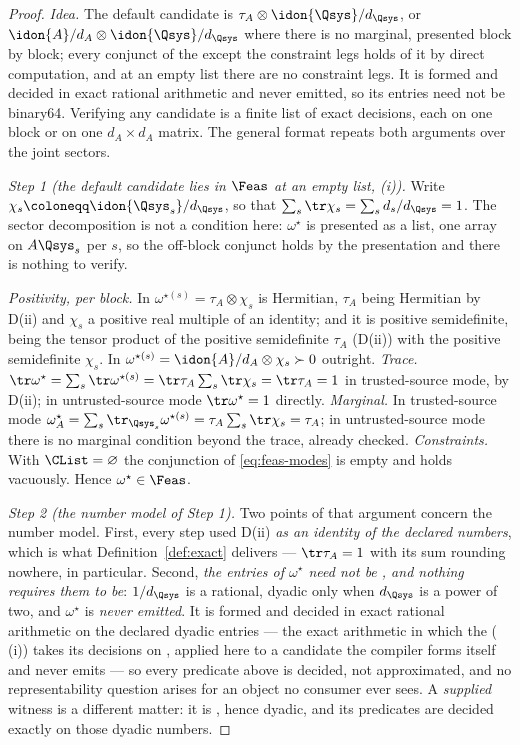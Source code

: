 \begin{proof}
\emph{Idea.} The default candidate is $\tau_A\otimes\idon{\Qsys}/d_{\Qsys}$,
or $\idon{A}/d_A\otimes\idon{\Qsys}/d_{\Qsys}$ where there is no marginal,
presented block by block; every conjunct of the  except
the constraint legs holds of it by direct computation, and at an empty list
there are no constraint legs. It is formed and decided in
exact rational arithmetic and never emitted, so its entries need not be
binary64. Verifying any candidate is a finite list of exact decisions, each on
one block or on one $d_A\times d_A$ matrix. The general format repeats both
arguments over the joint sectors.

\emph{Step 1 (the default candidate lies in $\Feas$ at an empty list, (i)).}
Write $\chi_s\coloneqq\idon{\Qsys_s}/d_{\Qsys}$, so that
$\sum_s\tr\chi_s=\sum_sd_s/d_{\Qsys}=1$. The sector decomposition is not a
condition here: $\omega^{\star}$ is presented as a list, one array on
$A\Qsys_s$ per $s$, so the off-block conjunct holds by the presentation and
there is nothing to verify.

\emph{Positivity, per block.} In 
$\omega^{\star(s)}=\tau_A\otimes\chi_s$ is Hermitian, $\tau_A$ being Hermitian
by D(ii) and $\chi_s$ a positive real multiple of an identity; and it is
positive semidefinite, being the tensor product of the positive semidefinite
$\tau_A$ (D(ii)) with the positive semidefinite $\chi_s$. In
 $\omega^{\star(s)}=\idon{A}/d_A\otimes\chi_s\succ0$ outright.
\emph{Trace.} $\tr\omega^{\star}=\sum_s\tr\omega^{\star(s)}
=\tr\tau_A\sum_s\tr\chi_s=\tr\tau_A=1$ in trusted-source mode, by D(ii); in
untrusted-source mode $\tr\omega^{\star}=1$ directly.
\emph{Marginal.} In trusted-source mode
$\omega^{\star}_A=\sum_s\tr_{\Qsys_s}\omega^{\star(s)}
=\tau_A\sum_s\tr\chi_s=\tau_A$; in untrusted-source mode there is no marginal
condition beyond the trace, already checked. \emph{Constraints.} With
$\CList=\varnothing$ the conjunction of \eqref{eq:feas-modes} is empty and
holds vacuously. Hence $\omega^{\star}\in\Feas$.

\emph{Step 2 (the number model of Step 1).} Two points of that argument
concern the number model. First, every step used D(ii) \emph{as an identity of
the declared numbers}, which is what Definition~\ref{def:exact} delivers ---
$\tr\tau_A=1$ with its sum rounding nowhere, in particular. Second,
\emph{the entries of $\omega^{\star}$ need not be , and
nothing requires them to be}: $1/d_{\Qsys}$ is a rational, dyadic only when
$d_{\Qsys}$ is a power of two, and $\omega^{\star}$ is \emph{never emitted}.
It is formed and decided in exact rational arithmetic on the declared dyadic
entries --- the exact arithmetic in which the 
(\,(i)) takes its decisions on
, applied here to a candidate the compiler forms itself
and never emits --- so every predicate above is decided, not approximated,
and no representability question arises for an
object no consumer ever sees. A \emph{supplied} witness is a different
matter: it is , hence dyadic, and its predicates are
decided exactly on those dyadic numbers.


\end{proof}

